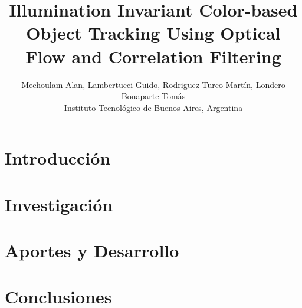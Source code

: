 

\usepackage[procnames]{listings}








\title{Illumination Invariant Color-based Object Tracking Using Optical Flow and Correlation Filtering}
\author{Mechoulam Alan, Lambertucci Guido, Rodriguez Turco Martín, Londero Bonaparte Tomás\\
\small{Instituto Tecnológico de Buenos Aires, Argentina}}
\maketitle

\begin{abstract}

\end{abstract}


\section{Introducción}

	
\section{Investigación}


\section{Aportes y Desarrollo}


%

\section{Conclusiones}


